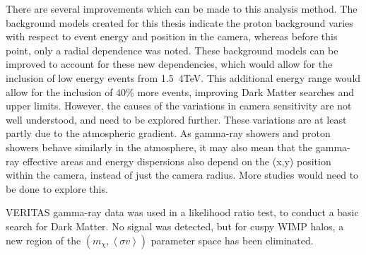 There are several improvements which can be made to this analysis method.
The background models created for this thesis indicate the proton background varies with respect to event energy and position in the camera, whereas before this point, only a radial dependence was noted.
These background models can be improved to account for these new dependencies, which would allow for the inclusion of low energy events from \SI{1.5}{4}{TeV}.
This additional energy range would allow for the inclusion of \nicetilde{}40\% more events, improving Dark Matter searches and upper limits.
However, the causes of the variations in camera sensitivity are not well understood, and need to be explored further.
These variations are at least partly due to the atmospheric gradient.
As gamma-ray showers and proton showers behave similarly in the atmosphere, it may also mean that the gamma-ray effective areas and energy dispersions also depend on the (x,y) position within the camera, instead of just the camera radius.
More studies would need to be done to explore this.

VERITAS gamma-ray data was used in a likelihood ratio test, to conduct a basic search for Dark Matter.
No signal was detected, but for cuspy WIMP halos, a new region of the $ \left ( m_{\chi}, \left \langle \sigma v \right \rangle \right )$ parameter space has been eliminated.

